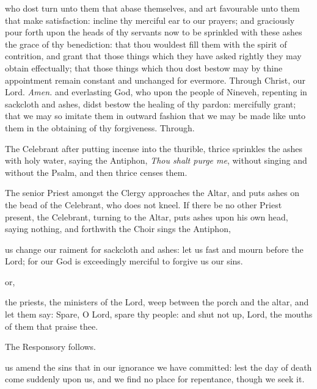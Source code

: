  who dost turn unto them that abase themselves, and art favourable unto them that make satisfaction: incline thy merciful ear to our prayers; and graciously pour forth upon the heads of thy servants now to be sprinkled with these ashes the grace of thy benediction: that thou wouldest fill them with the spirit of contrition, and grant that those things which they have asked rightly they may obtain effectually; that those things which thou dost bestow may by thine appointment remain constant and unchanged for evermore. Through Christ, our Lord. \textit{Amen.}
{} and everlasting God, who upon the people of Nineveh, repenting in sackcloth and ashes, didst bestow the healing of thy pardon: mercifully grant; that we may so imitate them in outward fashion that we may be made like unto them in the obtaining of thy forgiveness. Through.
\begin{rubric}
    The Celebrant after putting incense into the thurible, thrice sprinkles the ashes with holy water, saying the Antiphon, \emph{Thou shalt purge me}, without singing and without the Psalm, and then thrice censes them.
\end{rubric}
\begin{rubric}
    The senior Priest amongst the Clergy approaches the Altar, and puts ashes on the bead of the Celebrant, who does not kneel. If there be no other Priest present, the Celebrant, turning to the Altar, puts ashes upon his own head, saying nothing, and forthwith the Choir sings the Antiphon,
\end{rubric}
 us change our raiment for sackcloth and ashes: let us fast and mourn before the Lord; for our God is exceedingly merciful to forgive us our sins.
\begin{inhead}
    or,
\end{inhead}
 the priests, the ministers of the Lord, weep between the porch and the altar, and let them say: Spare, O Lord, spare thy people: and shut not up, Lord, the mouths of them that praise thee.
\begin{rubric}
    The Responsory follows.
\end{rubric}
 us amend the sins that in our ignorance we have committed: lest the day of death come suddenly upon us, and we find no place for repentance, though we seek it.\par
{}
